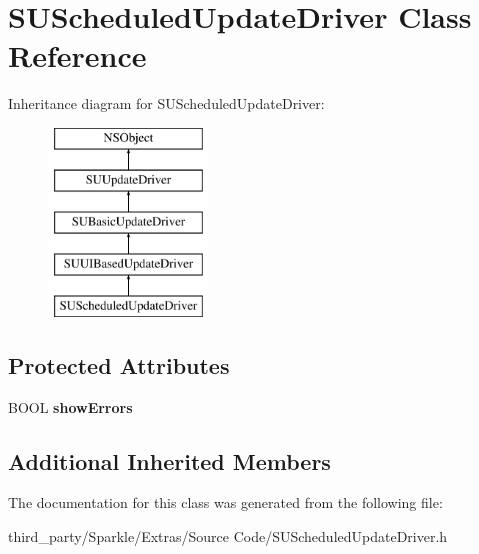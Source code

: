 \hypertarget{interface_s_u_scheduled_update_driver}{}\section{S\+U\+Scheduled\+Update\+Driver Class Reference}
\label{interface_s_u_scheduled_update_driver}
Inheritance diagram for S\+U\+Scheduled\+Update\+Driver\+:\begin{figure}[H]
\begin{center}
\leavevmode
\includegraphics[height=5.000000cm]{interface_s_u_scheduled_update_driver}
\end{center}
\end{figure}
\subsection*{Protected Attributes}
\begin{DoxyCompactItemize}
\item 
\mbox{\label{interface_s_u_scheduled_update_driver_a17072ad4f23e8b9319f47d8bac4a50cb}} 
B\+O\+OL {\bfseries show\+Errors}
\end{DoxyCompactItemize}
\subsection*{Additional Inherited Members}


The documentation for this class was generated from the following file\+:\begin{DoxyCompactItemize}
\item 
third\+\_\+party/\+Sparkle/\+Extras/\+Source Code/S\+U\+Scheduled\+Update\+Driver.\+h\end{DoxyCompactItemize}
